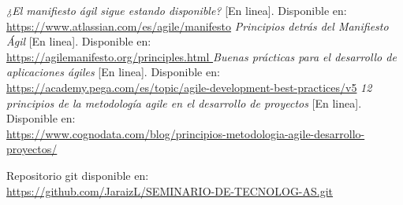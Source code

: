 \documentclass[12pt]{article}
\begin{document}
\begin{thebibliography}{9}
\textit{¿El manifiesto ágil sigue estando disponible?} [En linea]. Disponible en:\\ \url{https://www.atlassian.com/es/agile/manifesto}
\textit{Principios detrás del Manifiesto Ágil} [En linea]. Disponible en:\\ \url{https://agilemanifesto.org/principles.html }
\textit{Buenas prácticas para el desarrollo de aplicaciones ágiles} [En linea]. Disponible en:\\ \url{https://academy.pega.com/es/topic/agile-development-best-practices/v5}
\textit{12 principios de la metodología agile en el desarrollo de proyectos} [En linea]. Disponible en:\\ \url{https://www.cognodata.com/blog/principios-metodologia-agile-desarrollo-proyectos/}


\end{thebibliography}

Repositorio git disponible en:\\ \url{https://github.com/JaraizL/SEMINARIO-DE-TECNOLOG-AS.git}
\end{document}
